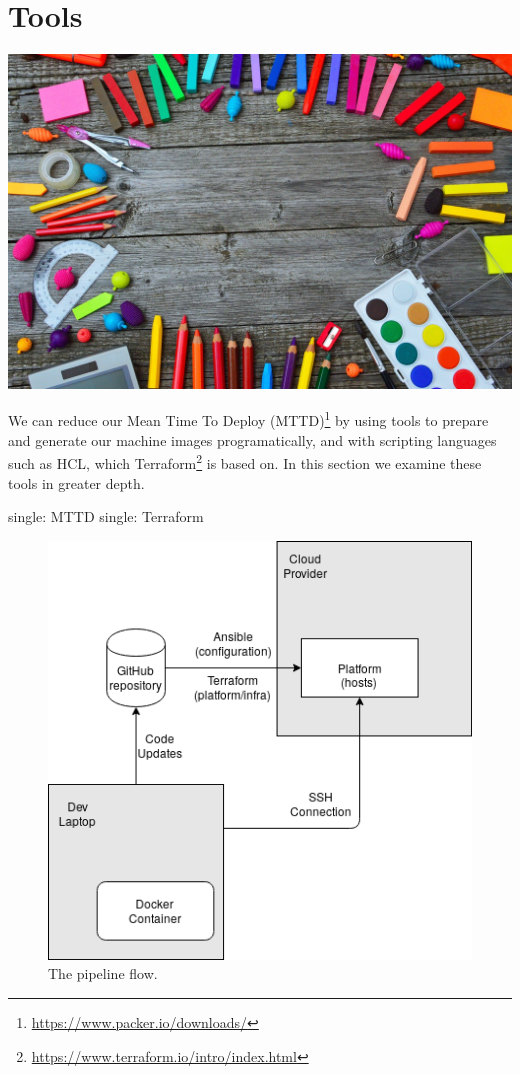 \chapter{Tools}

\includegraphics{../images/school-tools-3596680_1920.jpg}

We can reduce our Mean Time To Deploy (MTTD)\footnote{\url{https://www.packer.io/downloads/}}
by using tools to prepare and generate our machine images
programatically, and with scripting languages such as HCL, which
Terraform\footnote{\url{https://www.terraform.io/intro/index.html}}
is based on. In this section we examine these tools in greater depth.

single: MTTD
single: Terraform

\begin{figure}
   \centering
   \includegraphics{../images/infra_flow.png}
   \caption{The pipeline flow.}
\end{figure}


